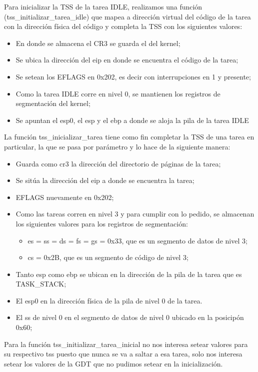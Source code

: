 \indent Para inicializar la TSS de la tarea IDLE, realizamos una función (tss\_initializar\_tarea\_idle) que mapea a dirección virtual del código de la tarea con la dirección física del código y completa la TSS con los siguientes valores:
\begin{itemize}
	\item En donde se almacena el CR3 se guarda el del kernel;
	\item Se ubica la direcci\'on del eip en donde se encuentra el c\'odigo de la tarea;
	\item Se setean los EFLAGS en 0x202, es decir con interrupciones en 1 y presente;
	\item Como la tarea IDLE corre en nivel 0, se mantienen los registros de segmentación del kernel;
	\item Se apuntan el esp0, el esp y el ebp a donde se aloja la pila de la tarea IDLE
\end{itemize}


\indent La función tss\_inicializar\_tarea tiene como fin completar la TSS de una tarea en particular, la que se pasa por parámetro y lo hace de la siguiente manera:\\
\begin{itemize}
	\item Guarda como cr3 la dirección del directorio de páginas de la tarea;
	\item Se sitúa la dirección del eip a donde se encuentra la tarea;
	\item EFLAGS nuevamente en 0x202;
	\item Como las tareas corren en nivel 3 y para cumplir con lo pedido, se almacenan los siguientes valores para los registros de segmentación:
		\begin{itemize}
		\item es = ss = ds = fs = gs = 0x33, que es un segmento de datos de nivel 3;
		\item cs = 0x2B, que es un segmento de código de nivel 3;
		\end{itemize}
	\item Tanto esp como ebp se ubican en la dirección de la pila de la tarea que es TASK\_STACK;
	\item El esp0 en  la dirección física de la pila de nivel 0 de la tarea.
	\item El ss de nivel 0 en el segmento de datos de nivel 0 ubicado en la posicipón 0x60;
\end{itemize}

\indent Para la funci\'on tss\_initializar\_tarea\_inicial no nos interesa setear valores para su respectivo tss puesto que nunca se va a saltar a esa tarea, solo nos interesa setear los valores de la GDT que no pudimos setear en la inicializaci\'on.\\


